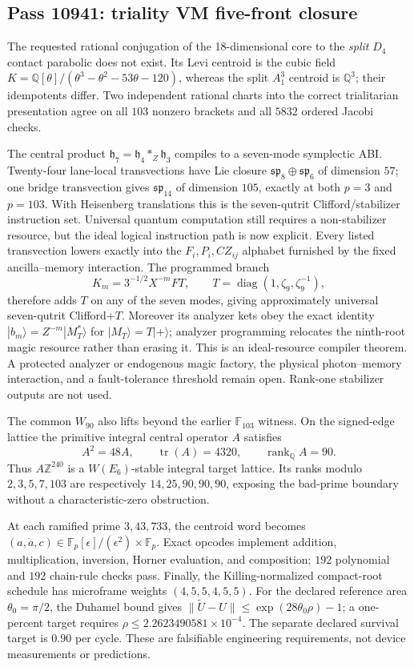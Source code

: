 \subsection{Pass 10941: triality VM five-front closure}

The requested rational conjugation of the 18-dimensional core to the
\emph{split} $D_4$ contact parabolic does not exist. Its Levi centroid is the
cubic field $K=\mathbb Q[\theta]/(\theta^3-\theta^2-53\theta-120)$, whereas
the split $A_1^3$ centroid is $\mathbb Q^3$; their idempotents differ. Two
independent rational charts into the correct trialitarian presentation agree
on all $103$ nonzero brackets and all $5832$ ordered Jacobi checks.

The central product
$\mathfrak h_7=\mathfrak h_4*_{Z}\mathfrak h_3$ compiles to a seven-mode
symplectic ABI. Twenty-four lane-local transvections have Lie closure
$\mathfrak{sp}_8\oplus\mathfrak{sp}_6$ of dimension $57$; one bridge
transvection gives $\mathfrak{sp}_{14}$ of dimension $105$, exactly at both
$p=3$ and $p=103$. With Heisenberg translations this is the seven-qutrit
Clifford/stabilizer instruction set. Universal quantum computation still
requires a non-stabilizer resource, but the ideal logical instruction path is
now explicit. Every listed transvection lowers exactly into the
$F_i,P_i,CZ_{ij}$ alphabet furnished by the fixed ancilla--memory interaction.
The programmed branch
\[
 K_m=3^{-1/2}X^{-m}FT,
 \qquad T=\operatorname{diag}(1,\zeta_9,\zeta_9^{-1}),
\]
therefore adds $T$ on any of the seven modes, giving approximately universal
seven-qutrit Clifford+$T$. Moreover its analyzer kets obey the exact identity
$|b_m\rangle=Z^{-m}|M_T^*\rangle$ for $|M_T\rangle=T|+\rangle$; analyzer
programming relocates the ninth-root magic resource rather than erasing it.
This is an ideal-resource compiler theorem. A protected analyzer or endogenous
magic factory, the physical photon--memory interaction, and a fault-tolerance
threshold remain open. Rank-one stabilizer outputs are not used.

The common $W_{90}$ also lifts beyond the earlier $\mathbb F_{103}$ witness.
On the signed-edge lattice the primitive integral central operator $A$
satisfies
\[
 A^2=48A,\qquad \operatorname{tr}(A)=4320,
 \qquad \operatorname{rank}_{\mathbb Q}A=90.
\]
Thus $A\mathbb Z^{240}$ is a $W(E_6)$-stable integral target lattice. Its
ranks modulo $2,3,5,7,103$ are respectively $14,25,90,90,90$, exposing the
bad-prime boundary without a characteristic-zero obstruction.

At each ramified prime $3,43,733$, the centroid word becomes
$(a,\dot a,c)\in\mathbb F_p[\epsilon]/(\epsilon^2)\times\mathbb F_p$.
Exact opcodes implement addition, multiplication, inversion, Horner
evaluation, and composition; $192$ polynomial and $192$ chain-rule checks
pass. Finally, the Killing-normalized compact-root schedule has microframe
weights $(4,5,5,4,5,5)$. For the declared reference area
$\theta_0=\pi/2$, the Duhamel bound gives
$\|\widetilde U-U\|\leq\exp(28\theta_0\rho)-1$; a one-percent target requires
$\rho\leq2.2623490581\times10^{-4}$. The separate declared survival target is
$0.90$ per cycle. These are falsifiable engineering requirements, not device
measurements or predictions.
